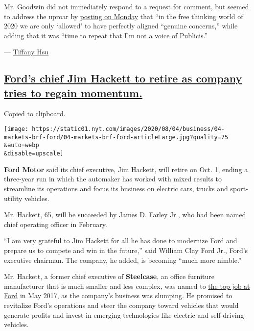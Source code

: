 Mr. Goodwin did not immediately respond to a request for comment, but
seemed to address the uproar by
\href{https://twitter.com/tomfgoodwin/status/1290340999672332291}{posting
on Monday} that ``in the free thinking world of 2020 we are only
`allowed' to have perfectly aligned ``genuine concerns,'' while adding
that it was ``time to repeat that I'm
\href{https://twitter.com/tomfgoodwin/status/1290325449529274370?s=20}{not
a voice of Publicis}.''

--- \href{https://www.nytimes.com/by/tiffany-hsu}{Tiffany Hsu}

\hypertarget{fords-chief-jim-hackett-to-retire-as-company-tries-to-regain-momentum}{%
\subsection{\texorpdfstring{\protect\hyperlink{fords-chief-jim-hackett-to-retire-as-company-tries-to-regain-momentum}{Ford's
chief Jim Hackett to retire as company tries to regain
momentum.}}{Ford's chief Jim Hackett to retire as company tries to regain momentum.}}\label{fords-chief-jim-hackett-to-retire-as-company-tries-to-regain-momentum}}

Copied to clipboard.

\texttt{[image: https://static01.nyt.com/images/2020/08/04/business/04-markets-brf-ford/04-markets-brf-ford-articleLarge.jpg?quality=75\\\&auto=webp\\\&disable=upscale]}

\textbf{Ford Motor} said its chief executive, Jim Hackett, will retire
on Oct. 1, ending a three-year run in which the automaker has worked
with mixed results to streamline its operations and focus its business
on electric cars, trucks and sport-utility vehicles.

Mr. Hackett, 65, will be succeeded by James D. Farley Jr., who had been
named chief operating officer in February.

``I am very grateful to Jim Hackett for all he has done to modernize
Ford and prepare us to compete and win in the future,'' said William
Clay Ford Jr., Ford's executive chairman. The company, he added, is
becoming ``much more nimble.''

Mr. Hackett, a former chief executive of \textbf{Steelcase}, an office
furniture manufacturer that is much smaller and less complex, was named
to
\href{https://www.nytimes.com/2017/05/22/business/jim-hackett-ford.html}{the
top job at Ford} in May 2017, as the company's business was slumping. He
promised to revitalize Ford's operations and steer the company toward
vehicles that would generate profits and invest in emerging technologies
like electric and self-driving vehicles.

